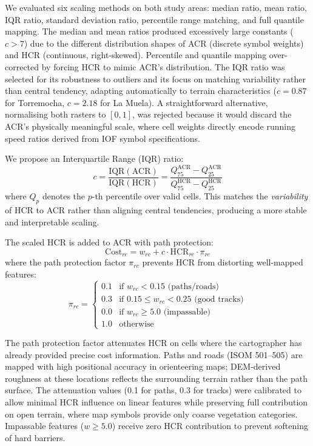 \documentclass[preprint,11pt]{elsarticle}
\begin{document}
We evaluated six scaling methods on both study areas: median ratio, mean ratio, IQR ratio, standard deviation ratio, percentile range matching, and full quantile mapping.
The median and mean ratios produced excessively large constants ($c > 7$) due to the different distribution shapes of ACR (discrete symbol weights) and HCR (continuous, right-skewed).
Percentile and quantile mapping over-corrected by forcing HCR to mimic ACR's distribution.
The IQR ratio was selected for its robustness to outliers and its focus on matching variability rather than central tendency, adapting automatically to terrain characteristics ($c = 0.87$ for Torremocha, $c = 2.18$ for La Muela).
A straightforward alternative, normalising both rasters to $[0,1]$, was rejected because it would discard the ACR's physically meaningful scale, where cell weights directly encode running speed ratios derived from IOF symbol specifications.

We propose an Interquartile Range (IQR) ratio:
\begin{equation}
  c = \frac{\text{IQR}(\text{ACR})}{\text{IQR}(\text{HCR})} = \frac{Q_{75}^{\text{ACR}} - Q_{25}^{\text{ACR}}}{Q_{75}^{\text{HCR}} - Q_{25}^{\text{HCR}}}
  \label{eq:iqr}
\end{equation}
where $Q_p$ denotes the $p$-th percentile over valid cells.
This matches the \emph{variability} of HCR to ACR rather than aligning central tendencies, producing a more stable and interpretable scaling.

The scaled HCR is added to ACR with path protection:
\begin{equation}
  \text{Cost}_{rc} = w_{rc} + c \cdot \text{HCR}_{rc} \cdot \pi_{rc}
  \label{eq:combined}
\end{equation}
where the path protection factor $\pi_{rc}$ prevents HCR from distorting well-mapped features:
\begin{equation}
  \pi_{rc} = \begin{cases}
    0.1 & \text{if } w_{rc} < 0.15 \text{ (paths/roads)} \\
    0.3 & \text{if } 0.15 \leq w_{rc} < 0.25 \text{ (good tracks)} \\
    0.0 & \text{if } w_{rc} \geq 5.0 \text{ (impassable)} \\
    1.0 & \text{otherwise}
  \end{cases}
  \label{eq:pathprot}
\end{equation}

The path protection factor attenuates HCR on cells where the cartographer has already provided precise cost information.
Paths and roads (ISOM 501--505) are mapped with high positional accuracy in orienteering maps; DEM-derived roughness at these locations reflects the surrounding terrain rather than the path surface.
The attenuation values (0.1 for paths, 0.3 for tracks) were calibrated to allow minimal HCR influence on linear features while preserving full contribution on open terrain, where map symbols provide only coarse vegetation categories.
Impassable features ($w \geq 5.0$) receive zero HCR contribution to prevent softening of hard barriers.
\end{document}
